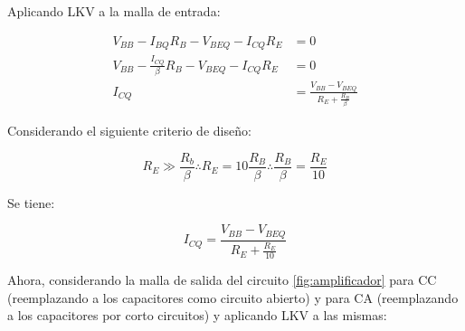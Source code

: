 Aplicando LKV a la malla de entrada:

\begin{align}
    V_{BB} - I_{BQ} R_B - V_{BEQ} - I_{CQ} R_E &= 0 \nonumber \\
    V_{BB} - \frac{I_{CQ}}{\beta} R_B - V_{BEQ} - I_{CQ} R_E &= 0 \nonumber \\
    I_{CQ} &= \frac{V_{BB} - V_{BEQ}}{R_E + \frac{R_B}{\beta}} \label{eq:icq}
\end{align}

Considerando el siguiente criterio de diseño: 

\begin{equation}
    R_E  \gg \frac{R_b}{\beta} \therefore R_E = 10\frac{R_B}{\beta} \therefore \frac{R_B}{\beta} = \frac{R_E}{10} \label{ec:criterio-diseño}
\end{equation}

Se tiene:

\begin{equation}
    I_{CQ} = \frac{V_{BB} - V_{BEQ}} {R_E + \frac{R_E}{10}} \label{ec:icqmes1}
\end{equation}

Ahora, considerando la malla de salida del circuito \ref{fig:amplificador} para CC (reemplazando a los capacitores como
circuito abierto) y para CA (reemplazando a los capacitores por corto circuitos) y aplicando LKV a las mismas:

